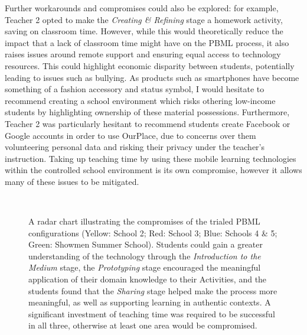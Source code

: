 Further workarounds and compromises could also be explored: for example, Teacher 2 opted to make the \textit{Creating \& Refining} stage a homework activity, saving on classroom time. However, while this would theoretically reduce the impact that a lack of classroom time might have on the PBML process, it also raises issues around remote support and ensuring equal access to technology resources. This could highlight economic disparity between students, potentially leading to issues such as bullying. As products such as smartphones have become something of a fashion accessory and status symbol, I would hesitate to recommend creating a school environment which risks othering low-income students by highlighting ownership of these material possessions. Furthermore, Teacher 2 was particularly hesitant to recommend students create Facebook or Google accounts in order to use OurPlace, due to concerns over them volunteering personal data and risking their privacy under the teacher's instruction. Taking up teaching time by using these mobile learning technologies within the controlled school environment is its own compromise, however it allows many of these issues to be mitigated.

\begin{figure}
\centering
  \caption[A radar chart illustrating the compromises of the different PBML configurations.]{A radar chart illustrating the compromises of the trialed PBML configurations (Yellow: School 2; Red: School 3; Blue: Schools 4 \& 5; Green: Showmen Summer School). Students could gain a greater understanding of the technology through the \textit{Introduction to the Medium} stage, the \textit{Prototyping} stage encouraged the meaningful application of their domain knowledge to their Activities, and the students found that the \textit{Sharing} stage helped make the process more meaningful, as well as supporting learning in authentic contexts. A significant investment of teaching time was required to be successful in all three, otherwise at least one area would be compromised. }~\label{fig:PBMLradar}
\end{figure}

